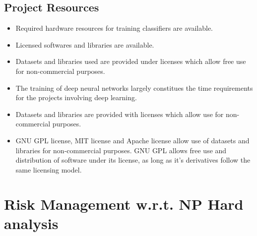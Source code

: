 \documentclass[oneside,a4paper,12pt]{report}
\begin{document}
\begin{normalsize}
\subsection{Project Resources}
         \begin{itemize}
         \item Required hardware resources for training classifiers are available.
         \item Licensed softwares and libraries are available.
         \item Datasets and libraries used are provided under licenses which allow free use for non-commercial purposes. 
         \item The training of deep neural networks largely constitues the time requirements for the projects involving deep learning.
         \item Datasets and libraries are provided with licenses which allow use for non-commercial purposes.
         \item GNU GPL license, MIT license and Apache license allow use of datasets and libraries for non-commercial purposes. GNU GPL allows free use and  distribution of software under its license, as long as it's derivatives follow the same licensing model.
        \end{itemize}
         

\section{Risk Management w.r.t. NP Hard analysis}


\end{normalsize}
\end{document}

